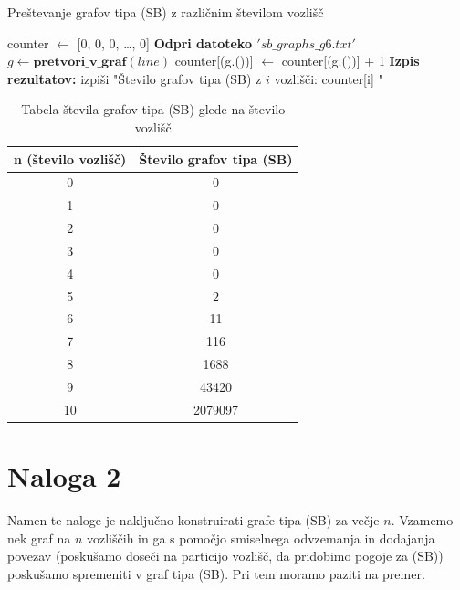 \documentclass{article}
\begin{document}
\begin{algorithm}
    \caption{Preštevanje grafov tipa (SB) z različnim številom vozlišč}
    \begin{algorithmic}[1]
    \State counter $\gets$ [0, 0, 0, \dots, 0] 
    \State \textbf{Odpri datoteko $'sb\_graphs\_g6.txt'$}
        \State $g \gets \textbf{pretvori\_v\_graf}(line)$ 
        \State counter[(g.())] $\gets$ counter[(g.())] + 1
    \EndFor
    \State \textbf{Izpis rezultatov:}
        \State izpiši "Število grafov tipa (SB) z $i$ vozlišči: counter[i] "
    \EndFor
    \end{algorithmic}
 \end{algorithm}

 \begin{table}[h!]
    \centering
    \begin{tabular}{|c|c|}
    \hline
    \textbf{n (število vozlišč)} & \textbf{Število grafov tipa (SB)} \\
    \hline
    0 & 0 \\
    1 & 0 \\
    2 & 0 \\
    3 & 0 \\
    4 & 0 \\
    5 & 2 \\
    6 & 11 \\
    7 & 116\\
    8 & 1688\\
    9 & 43420 \\
    10 & 2079097 \\
    \hline
    \end{tabular}
    \caption{Tabela števila grafov tipa (SB) glede na število vozlišč}
    \end{table}

\section{Naloga 2}

Namen te naloge je naključno konstruirati grafe tipa (SB) za večje $n$.
Vzamemo nek graf na $n$ vozliščih in ga s pomočjo smiselnega odvzemanja in dodajanja povezav 
(poskušamo doseči na particijo vozlišč, da pridobimo pogoje za (SB)) poskušamo 
spremeniti v graf tipa (SB). Pri tem moramo paziti na premer.
\end{document}
